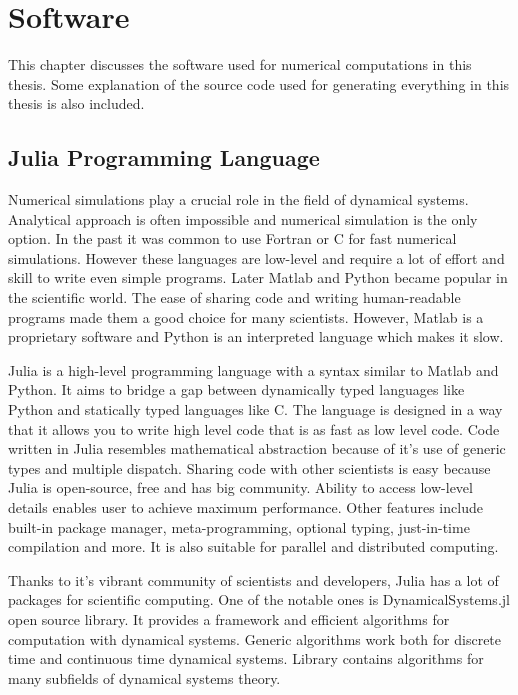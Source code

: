 \chapter{Software}
\label{sec:software}

This chapter discusses the software used for numerical computations in this thesis.
Some explanation of the source code used for generating everything in this thesis is also included.

\section{Julia Programming Language}
Numerical simulations play a crucial role in the field of dynamical systems.
Analytical approach is often impossible and numerical simulation is the only option.
In the past it was common to use Fortran or C for fast numerical simulations.
However these languages are low-level and require a lot of effort and skill to write even simple programs.
Later Matlab and Python became popular in the scientific world.
The ease of sharing code and writing human-readable programs made them a good choice for many scientists.
However, Matlab is a proprietary software and Python is an interpreted language which makes it slow.
\par
Julia is a high-level programming language with a syntax similar to Matlab and Python.
It aims to bridge a gap between dynamically typed languages like Python and statically typed languages like C.
The language is designed in a way that it allows you to write high level code that is as fast as low level code.
Code written in Julia resembles mathematical abstraction because of it's use of generic types and multiple dispatch. 
Sharing code with other scientists is easy because Julia is open-source, free and has big community. 
Ability to access low-level details enables user to achieve maximum performance.
Other features include built-in package manager, meta-programming, optional typing, just-in-time compilation and more.
It is also suitable for parallel and distributed computing.~\cite{Bezanson2017,Bezanson20181024}
\par
Thanks to it's vibrant community of scientists and developers, Julia has a lot of packages for scientific computing.
One of the notable ones is DynamicalSystems.jl open source library.
It provides a framework and efficient algorithms for computation with dynamical systems.
Generic algorithms work both for discrete time and continuous time dynamical systems.
Library contains algorithms for many subfields of dynamical systems theory.~\cite{Datseris2018}
